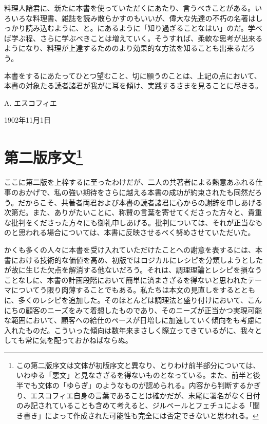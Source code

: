 料理人諸君に、新たに本書を使っていただくにあたり、言うべきことがある。いろいろな料理書、雑誌を読み散らかすのもいいが、偉大な先達の不朽の名著はしっかり読み込むように、と。にあるように「知り過ぎることなはい」のだ。学べば学ぶ程、さらに学ぶべきことは増えていく。そうすれば、柔軟な思考が出来るようになり、料理が上達するためのより効果的な方法を知ることも出来るだろう。

本書をするにあたってひとつ望むこと、切に願うのことは、上記の点において、本書の対象たる読者諸君が我がに耳を傾け、実践するさまを見ることに尽きる。\nopagebreak

\begin{flushright}
A. エスコフィエ \nopagebreak
\end{flushright}

1902年11月1日

\newpage

\hypertarget{introduction-deuxieme-edition}{%
\section[第二版序文]{\texorpdfstring{第二版序文\footnote{この第二版序文は文体が初版序文と異なり、とりわけ前半部分については、いわゆる「悪文」と見なさざるを得ないものとなっている。また、前半と後半でも文体の「ゆらぎ」のようなものが認められる。内容から判断するかぎり、エスコフィエ自身の言葉であることは確かだが、末尾に署名がなく日付のみ記されていることも含めて考えると、ジルベールとフェチュによる「聞き書き」によって作成された可能性も完全には否定できないと思われる。}}{第二版序文}}\label{introduction-deuxieme-edition}}

\normalsize
{}
\vspace*{1\zw}

ここに第二版を上梓するに至ったわけだが、二人の共著者による熱意あふれる仕事のおかげで、私の強い期待をさらに越える本書の成功が約束されたも同然だろう。だからこそ、共著者両君および本書の読者諸君に心からの謝辞を申しあげる次第だ。また、ありがたいことに、称賛の言葉を寄せてくださった方々と、貴重な批判をくださった方々にも御礼申しあげる。批判については、それが正当なものと思われる場合については、本書に反映させるべく努めさせていただいた。

かくも多くの人々に本書を受け入れていただけたことへの謝意を表するには、本書における技術的な価値を高め、初版ではロジカルにレシピを分類しようとしたが故に生じた欠点を解消する他ないだろう。それは、調理理論とレシピを損なうことなしに、本書の計画段階において簡単に済まさざるを得ないと思われたテーマについてう限り肉薄することでもある。私たちは本文の見直しをするとともに、多くのレシピを追加した。そのほとんどは調理法と盛り付けにおいて、こんにちの顧客のニーズをみて着想したものであり、そのニーズが正当かつ実現可能な範囲において、顧客への給仕のペースが日増しに加速していく傾向をも考慮に入れたものだ。こういった傾向は数年来まさしく際立ってきているがに、我々としても常に気を配っておかねばならぬ。

